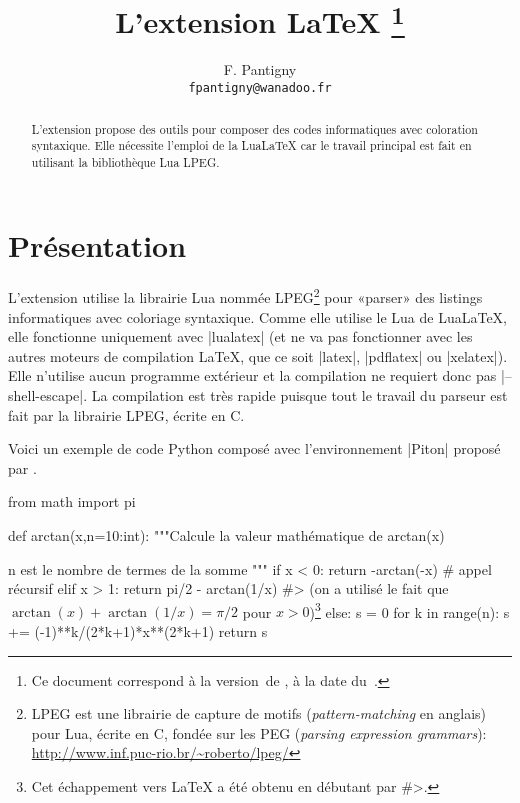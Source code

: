 \documentclass[dvipsnames,svgnames]{article}
\begin{document}
\VerbatimFootnotes


\title{L'extension LaTeX \thanks{Ce document correspond à la 
version~\PitonFileVersion\space de , à la date du~\PitonFileDate.}} 
\author{F. Pantigny \\ \texttt{fpantigny@wanadoo.fr}}

\maketitle

\begin{abstract}
L'extension  propose des outils pour composer des codes informatiques avec coloration syntaxique. Elle
nécessite l'emploi de la LuaLaTeX car le travail principal est fait en utilisant la bibliothèque Lua LPEG. 
\end{abstract}



\section{Présentation}

L'extension  utilise la librairie Lua nommée LPEG\footnote{LPEG est une librairie de capture de motifs
  (\emph{pattern-matching} en anglais) pour Lua, écrite en C, fondée sur les PEG (\emph{parsing expression
    grammars}): \url{http://www.inf.puc-rio.br/~roberto/lpeg/}} pour «parser» des listings informatiques avec
coloriage syntaxique. Comme elle utilise le Lua de LuaLaTeX, elle fonctionne uniquement avec |lualatex| 
(et ne va pas fonctionner avec les autres moteurs de compilation LaTeX, que ce soit |latex|, |pdflatex| ou
|xelatex|). Elle n'utilise aucun programme extérieur et la compilation ne requiert donc pas |--shell-escape|. La
compilation est très rapide puisque tout le travail du parseur est fait par la librairie LPEG, écrite en C.

\bigskip
Voici un exemple de code Python composé avec l'environnement |{Piton}| proposé par .


\bigskip
\begin{Piton}
from math import pi

def arctan(x,n=10:int):
    """Calcule la valeur mathématique de arctan(x)

    n est le nombre de termes de la somme
    """
    if x < 0:
        return -arctan(-x) # appel récursif
    elif x > 1: 
        return pi/2 - arctan(1/x) 
        #> (on a utilisé le fait que $\arctan(x)+\arctan(1/x)=\pi/2$ pour $x>0$)\footnote{Cet échappement vers LaTeX a été obtenu en débutant par \ttfamily\#>.} 
    else: 
        s = 0
        for k in range(n):
            s += (-1)**k/(2*k+1)*x**(2*k+1)
        return s 
\end{Piton}
\end{document}
